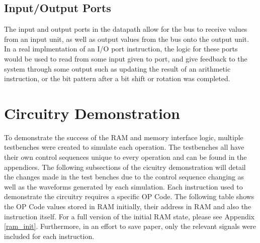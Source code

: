 \documentclass{article}
\begin{document}
    \subsection{Input/Output Ports}
    The input and output ports in the datapath allow for the bus to receive values from an input unit, as well as output values from the bus onto the output unit. In a real implmentation of an I/O port instruction, the logic for these ports would be used to read from some input given to port, and give feedback to the system through some output such as updating the result of an arithmetic instruction, or the bit pattern after a bit shift or rotation was completed.

\section{Circuitry Demonstration}
    To demonstrate the success of the RAM and memory interface logic, multiple testbenches were created to simulate each operation.  The testbenches all have their own control sequences unique to every operation and can be found in the appendices. The following subsections of the cicuitry demonstration will detail the changes made in the test benches due to the control sequence changing as well as the waveforms generated by each simulation. Each instruction used to demonstrate the circuitry requires a specific OP Code. The following table shows the OP Code values stored in RAM initially, their address in RAM and also the instruction itself. For a full version of the initial RAM state, please see Appendix \ref{ram_init}. Furthermore, in an effort to save paper, only the relevant signals were included for each instruction.
\end{document}
